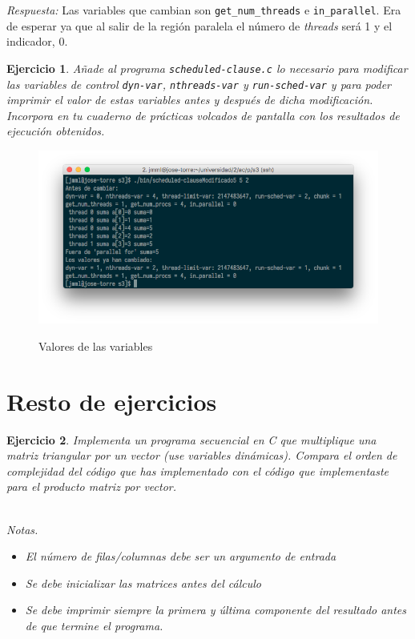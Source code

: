 \documentclass[11pt]{article}
\theoremstyle{definition-style}
\newtheorem{ejer}{Ejercicio}
\begin{document}
\emph{Respuesta:} Las variables que cambian son \texttt{get\_num\_threads} e \texttt{in\_parallel}. Era de esperar ya que al salir de la región paralela el número de \textit{threads} será 1 y el indicador, 0.

\begin{ejer}
    Añade al programa \texttt{scheduled-clause.c} lo necesario para modificar las variables de control \texttt{dyn-var}, \texttt{nthreads-var} y \texttt{run-sched-var} y para poder imprimir el valor de estas variables antes y después de dicha modificación. Incorpora en tu cuaderno de prácticas volcados de pantalla con los resultados de ejecución obtenidos.
\end{ejer}



\begin{figure}[H]
    \centering
    \caption{Valores de las variables}
    \includegraphics[width=0.9\linewidth]{./img/51.png}
    \label{fig:}
\end{figure}

\section*{Resto de ejercicios}
\label{sec:resto_de_ejercicios}

\begin{ejer}
    Implementa un programa secuencial en C que multiplique una matriz triangular por un vector (use variables dinámicas). Compara el orden de complejidad del código que has implementado con el código que implementaste para el producto matriz por vector.
    
    \hfill\\
    \textit{Notas.} \small \begin{itemize}
        \item El número de filas/columnas debe ser un argumento de entrada
        \item Se debe inicializar las matrices antes del cálculo
        \item Se debe imprimir siempre la primera y última componente del resultado antes de que termine el programa.
    \end{itemize} 
\end{ejer}
\end{document}
